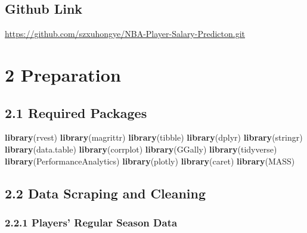 \documentclass[]{article}
\newenvironment{Shaded}{\begin{snugshade}}{\end{snugshade}}
\newcommand{\KeywordTok}[1]{\textcolor[rgb]{0.13,0.29,0.53}{\textbf{#1}}}
\newcommand{\NormalTok}[1]{#1}
\begin{document}
\subsection{Github Link}\label{github-link}

\url{https://github.com/szxuhongye/NBA-Player-Salary-Predicton.git}

\section{2 Preparation}\label{preparation}

\subsection{2.1 Required Packages}\label{required-packages}

\begin{Shaded}
\begin{Highlighting}[]
\KeywordTok{library}\NormalTok{(rvest)}
\KeywordTok{library}\NormalTok{(magrittr)}
\KeywordTok{library}\NormalTok{(tibble)}
\KeywordTok{library}\NormalTok{(dplyr)}
\KeywordTok{library}\NormalTok{(stringr)}
\KeywordTok{library}\NormalTok{(data.table)}
\KeywordTok{library}\NormalTok{(corrplot)}
\KeywordTok{library}\NormalTok{(GGally)}
\KeywordTok{library}\NormalTok{(tidyverse)}
\KeywordTok{library}\NormalTok{(PerformanceAnalytics)}
\KeywordTok{library}\NormalTok{(plotly)}
\KeywordTok{library}\NormalTok{(caret)}
\KeywordTok{library}\NormalTok{(MASS)}
\end{Highlighting}
\end{Shaded}

\subsection{2.2 Data Scraping and
Cleaning}\label{data-scraping-and-cleaning}

\subsubsection{2.2.1 Players' Regular Season
Data}\label{players-regular-season-data}
\end{document}
